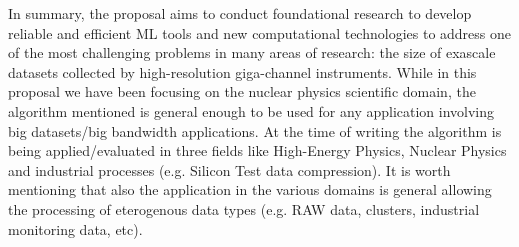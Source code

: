 In summary, the proposal aims to conduct foundational research to develop reliable and efficient ML tools and new computational technologies to address one of the most challenging problems in many areas of research: the size of exascale datasets collected by high-resolution giga-channel instruments. While in this proposal we have been focusing on the nuclear physics scientific domain, the algorithm mentioned is general enough to be used for any application involving big datasets/big bandwidth applications.  At the time of writing the algorithm is being applied/evaluated in three fields like High-Energy Physics, Nuclear Physics and industrial processes (e.g. Silicon Test data compression). It is worth mentioning that also the application in the various domains is general allowing the processing of eterogenous data types (e.g. RAW data, clusters, industrial monitoring data, etc). 
\clearpage
